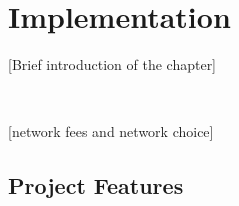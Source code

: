 \chapter{Implementation}
 [Brief introduction of the chapter]


~

[network fees and network choice]

\section{Project Features}
